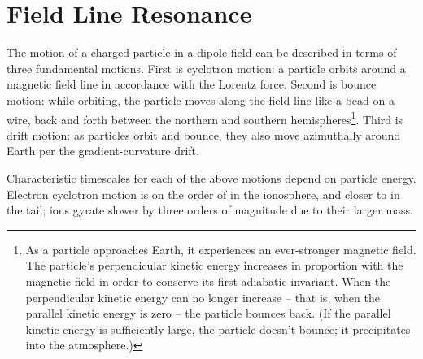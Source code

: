 \chapter{Field Line Resonance}
  \label{ch_flrs}



The motion of a charged particle in a dipole field can be described in terms of three fundamental motions. First is cyclotron motion: a particle orbits around a magnetic field line in accordance with the Lorentz force. Second is bounce motion: while orbiting, the particle moves along the field line like a bead on a wire, back and forth between the northern and southern hemispheres\footnote{As a particle approaches Earth, it experiences an ever-stronger magnetic field. The particle's perpendicular kinetic energy increases in proportion with the magnetic field in order to conserve its first adiabatic invariant. When the perpendicular kinetic energy can no longer increase -- that is, when the parallel kinetic energy is zero -- the particle bounces back. (If the parallel kinetic energy is sufficiently large, the particle doesn't bounce; it precipitates into the atmosphere.)}. Third is drift motion: as particles orbit and bounce, they also move azimuthally around Earth per the gradient-curvature drift. 

Characteristic timescales for each of the above motions depend on particle energy. Electron cyclotron motion is on the order of \todo{$\cdots$} in the ionosphere, and closer to \todo{$\cdots$} in the tail; ions gyrate slower by three orders of magnitude due to their larger mass. 



